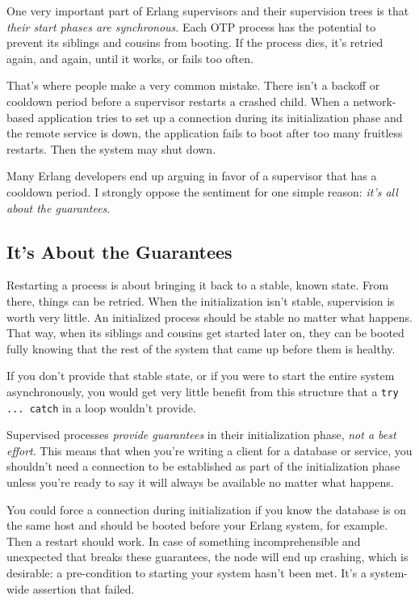 \documentclass[11pt, oneside]{book}   	%
\newcommand{\expression}[1]{\Verb`#1`}
\begin{document}
One very important part of Erlang supervisors and their supervision trees is that \emph{their start phases are synchronous}. Each OTP process has the potential to prevent its siblings and cousins from booting. If the process dies, it's retried again, and again, until it works, or fails too often.

That's where people make a very common mistake. There isn't a backoff or cooldown period before a supervisor restarts a crashed child. When a network-based application tries to set up a connection during its initialization phase and the remote service is down, the application fails to boot after too many fruitless restarts. Then the system may shut down.

Many Erlang developers end up arguing in favor of a supervisor that has a cooldown period. I strongly oppose the sentiment for one simple reason: \emph{it's all about the guarantees}.

\subsection{It's About the Guarantees}
\label{subsec:start-link-guarantees}

Restarting a process is about bringing it back to a stable, known state. From there, things can be retried. When the initialization isn't stable, supervision is worth very little. An initialized process should be stable no matter what happens. That way, when its siblings and cousins get started later on, they can be booted fully knowing that the rest of the system that came up before them is healthy.

If you don't provide that stable state, or if you were to start the entire system asynchronously, you would get very little benefit from this structure that a \expression{try ... catch} in a loop wouldn't provide.

Supervised processes \emph{provide guarantees} in their initialization phase, \emph{not a best effort}. This means that when you're writing a client for a database or service, you shouldn't need a connection to be established as part of the initialization phase unless you're ready to say it will always be available no matter what happens.

You could force a connection during initialization if you know the database is on the same host and should be booted before your Erlang system, for example. Then a restart should work. In case of something incomprehensible and unexpected that breaks these guarantees, the node will end up crashing, which is desirable: a pre-condition to starting your system hasn't been met. It's a system-wide assertion that failed.
\end{document}
